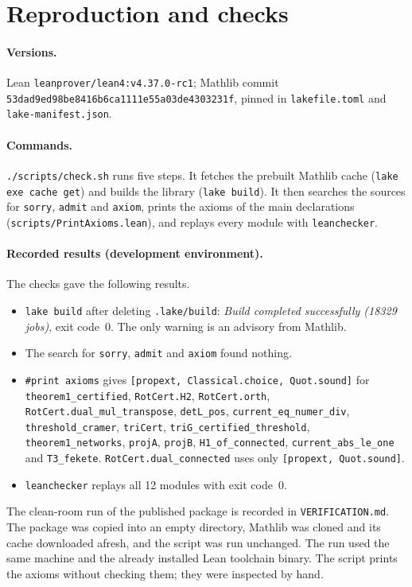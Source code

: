 \documentclass[11pt]{amsart}
\theoremstyle{plain}
\theoremstyle{definition}
\theoremstyle{remark}
\newcommand{\code}[1]{\texttt{#1}}
\begin{document}
\section{Reproduction and checks}\label{sec:repro}
\sloppy

\paragraph{Versions.} Lean \code{leanprover/lean4:v4.37.0-rc1}; Mathlib commit\\
\code{53dad9ed98be8416b6ca1111e55a03de4303231f}, pinned in \code{lakefile.toml} and \code{lake-manifest.json}.

\paragraph{Commands.} \code{./scripts/check.sh} runs five steps. It fetches the prebuilt Mathlib cache
(\code{lake exe cache get}) and builds the library (\code{lake build}). It then searches the sources for
\code{sorry}, \code{admit} and \code{axiom}, prints the axioms of the main declarations
(\code{scripts/PrintAxioms.lean}), and replays every module with \code{leanchecker}.

\paragraph{Recorded results (development environment).} The checks gave the following results.
\begin{itemize}
\item \code{lake build} after deleting \code{.lake/build}: \emph{Build completed successfully (18329 jobs)}, exit
  code~$0$. The only warning is an advisory from Mathlib.
\item The search for \code{sorry}, \code{admit} and \code{axiom} found nothing.
\item \code{\#print axioms} gives \code{[propext, Classical.choice, Quot.sound]} for \code{theorem1\_certified},
  \code{RotCert.H2}, \code{RotCert.orth}, \code{RotCert.dual\_mul\_transpose}, \code{detL\_pos},
  \code{current\_eq\_numer\_div}, \code{threshold\_cramer}, \code{triCert}, \code{triG\_certified\_threshold},
  \code{theorem1\_networks}, \code{projA}, \code{projB}, \code{H1\_of\_connected}, \code{current\_abs\_le\_one} and
  \code{T3\_fekete}. \code{RotCert.dual\_connected} uses only \code{[propext, Quot.sound]}.
\item \code{leanchecker} replays all 12 modules with exit code~$0$.
\end{itemize}
The clean-room run of the published package is recorded in \code{VERIFICATION.md}. The package was copied into an
empty directory, Mathlib was cloned and its cache downloaded afresh, and the script was run unchanged. The run used
the same machine and the already installed Lean toolchain binary. The script prints the axioms without checking
them; they were inspected by hand.
\end{document}
